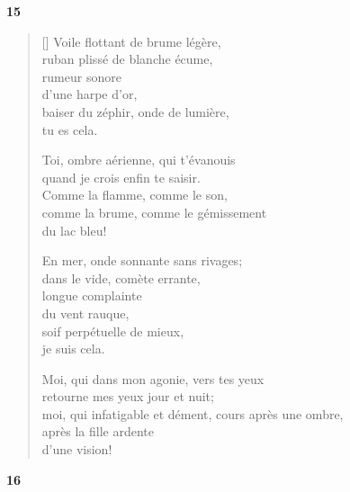 \documentclass[a4paper,12pt]{book}
\begin{document}
\bigskip

\begin{center}
  \textbf{15}
\end{center}

\settowidth{\versewidth}{Moi, qui dans mon agonie, vers tes yeux}

\begin{verse}[\versewidth]
  Voile flottant de brume légère, \\
  ruban plissé de blanche écume, \\
  rumeur sonore \\
  d'une harpe d'or, \\
  baiser du zéphir, onde de lumière, \\
  tu es cela.

  Toi, ombre aérienne, qui t'évanouis \\
  quand je crois enfin te saisir. \\
  Comme la flamme, comme le son, \\
  comme la brume, comme le gémissement \\
  du lac bleu!

  En mer, onde sonnante sans rivages; \\
  dans le vide, comète errante, \\
  longue complainte \\
  du vent rauque, \\
  soif perpétuelle de mieux, \\
  je suis cela.

  Moi, qui dans mon agonie, vers tes yeux \\
  retourne mes yeux jour et nuit; \\
  moi, qui infatigable et dément,
  cours après une ombre, \\
  après la fille ardente \\
  d'une vision!
\end{verse}

\bigskip

\begin{center}
  \textbf{16}
\end{center}

\settowidth{\versewidth}{Si quand les clochettes bleues de ton balcon}
\end{document}
